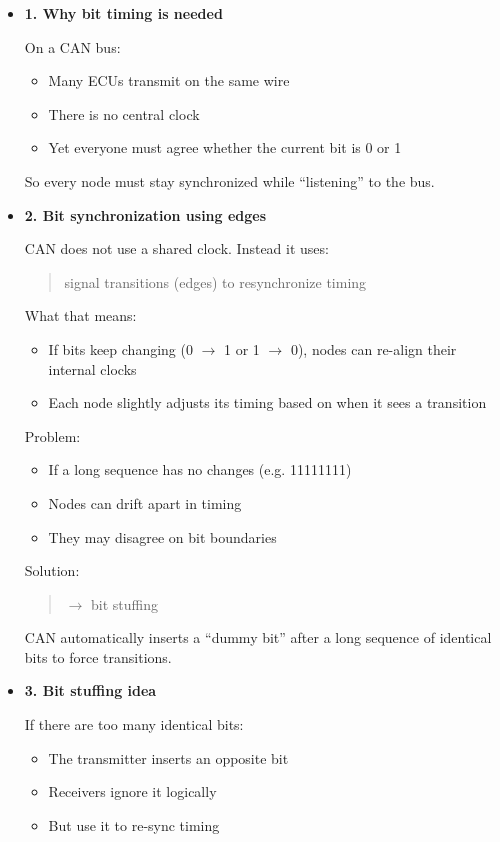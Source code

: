 \begin{itemize}

\item \textbf{1. Why bit timing is needed}

On a CAN bus:
\begin{itemize}
    \item Many ECUs transmit on the same wire
    \item There is no central clock
    \item Yet everyone must agree whether the current bit is 0 or 1
\end{itemize}

So every node must stay synchronized while ``listening'' to the bus.

\item \textbf{2. Bit synchronization using edges}

CAN does not use a shared clock. Instead it uses:
\begin{quote}
signal transitions (edges) to resynchronize timing
\end{quote}

What that means:
\begin{itemize}
    \item If bits keep changing (0 $\rightarrow$ 1 or 1 $\rightarrow$ 0), nodes can re-align their internal clocks
    \item Each node slightly adjusts its timing based on when it sees a transition
\end{itemize}

Problem:
\begin{itemize}
    \item If a long sequence has no changes (e.g. 11111111)
    \item Nodes can drift apart in timing
    \item They may disagree on bit boundaries
\end{itemize}

Solution:
\begin{quote}
$\rightarrow$ bit stuffing
\end{quote}

CAN automatically inserts a ``dummy bit'' after a long sequence of identical bits to force transitions.

\item \textbf{3. Bit stuffing idea}

If there are too many identical bits:
\begin{itemize}
    \item The transmitter inserts an opposite bit
    \item Receivers ignore it logically
    \item But use it to re-sync timing
\end{itemize}


\end{itemize}
